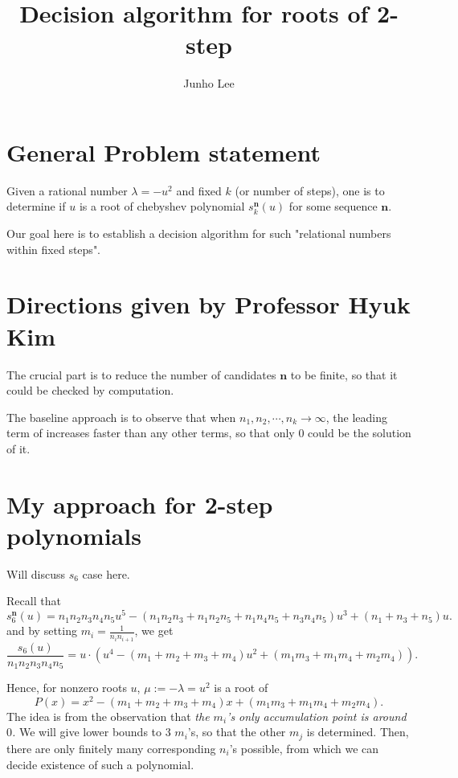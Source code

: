 \documentclass{article}
\title{Decision algorithm for roots of 2-step}
\author{Junho Lee}
\theoremstyle{definition}
\theoremstyle{plain}
\theoremstyle{remark}
\numberwithin{equation}{section}
\begin{document}
\pagecolor{white}
\color{black}
\maketitle

\section{General Problem statement}

Given a rational number $\lambda = -u^2$ and fixed $k$ (or number of steps),
one is to determine if $u$ is a root of chebyshev polynomial $s^\mathbf{n}_k(u)$ for some sequence $\mathbf{n}$.

Our goal here is to establish a decision algorithm for such "relational numbers within fixed steps".

\section{Directions given by Professor Hyuk Kim}

The crucial part is to reduce the number of candidates $\mathbf{n}$ to be finite,
so that it could be checked by computation.

The baseline approach is to observe that when $n_1, n_2, \cdots, n_k \to \infty$,
the leading term of increases faster than any other terms, so that only $0$ could be the solution of it.



\section{My approach for 2-step polynomials}

Will discuss $s_6$ case here.

Recall that
\[
  s^\mathbf{n}_6(u) = n_1 n_2 n_3 n_4 n_5 u^5
  - (n_1 n_2 n_3 + n_1 n_2 n_5 + n_1 n_4 n_5 + n_3 n_4 n_5) u^3
  + (n_1 + n_3 + n_5) u.
\]
and by setting $m_i = \frac{1}{n_i n_{i+1}}$, we get
\[
  \frac{s_6(u)}{n_1 n_2 n_3 n_4 n_5} = u \cdot (u^4 - (m_1 + m_2 + m_3 + m_4) u^2 + (m_1 m_3 + m_1 m_4 + m_2 m_4)).
\]

Hence, for nonzero roots $u$, $\mu := -\lambda = u^2$ is a root of
\[
  P(x) = x^2 - (m_1 + m_2 + m_3 + m_4) x + (m_1 m_3 + m_1 m_4 + m_2 m_4).
\]
The idea is from the observation that \textit{the $m_i$'s only accumulation point is around $0$.}
We will give lower bounds to 3 $m_i$'s, so that the other $m_j$ is determined.
Then, there are only finitely many corresponding $n_i$'s possible,
from which we can decide existence of such a polynomial.
\end{document}
